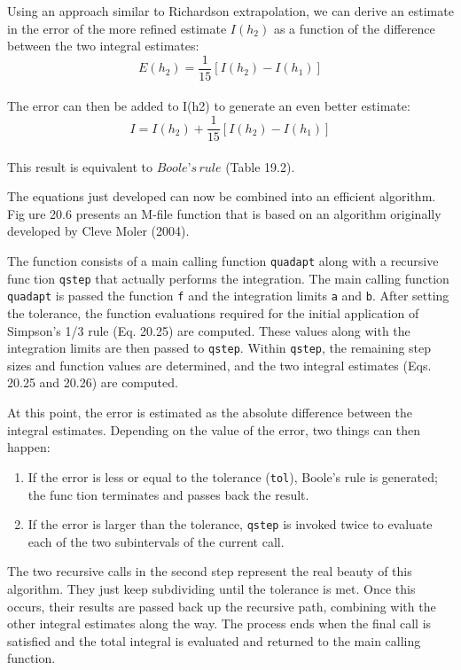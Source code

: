 Using an approach similar to Richardson extrapolation, we can derive an estimate in
the error of the more refined estimate $I(h_2)$ as a function of the difference between the two
integral estimates:
\begin{equation}
	\tag{20.29}
	E(h_2)=\dfrac{1}{15}[I(h_2)-I(h_1)]
\end{equation}\\
The error can then be added to I(h2) to generate an even better estimate:
\begin{equation}
	\tag{20.30}
	I=I(h_2)+\dfrac{1}{15}[I(h_2)-I(h_1)]
\end{equation}\\
This result is equivalent to $Boole’s \, rule$ (Table 19.2). 

The equations just developed can now be combined into an efficient algorithm. Figure 20.6 presents an M-file function that is based on an algorithm originally developed
by Cleve Moler (2004). 

The function consists of a main calling function \texttt{quadapt} along with a recursive function \texttt{qstep} that actually performs the integration. The main calling function \texttt{quadapt} is passed the function \texttt{f} and the integration limits \texttt{a} and \texttt{b}. After setting the tolerance, the
function evaluations required for the initial application of Simpson’s 1/3 rule (Eq. 20.25)
are computed. These values along with the integration limits are then passed to \texttt{qstep}. Within \texttt{qstep}, the remaining step sizes and function values are determined, and the two
integral estimates (Eqs. 20.25 and 20.26) are computed.

At this point, the error is estimated as the absolute difference between the integral
estimates. Depending on the value of the error, two things can then happen:

\begin{enumerate}
	\item If the error is less or equal to the tolerance (\texttt{tol}), Boole’s rule is generated; the function terminates and passes back the result.
	\item If the error is larger than the tolerance, \texttt{qstep} is invoked twice to evaluate each of the
two subintervals of the current call.
\end{enumerate}

The two recursive calls in the second step represent the real beauty of this algorithm.
They just keep subdividing until the tolerance is met. Once this occurs, their results are
passed back up the recursive path, combining with the other integral estimates along the
way. The process ends when the final call is satisfied and the total integral is evaluated and
returned to the main calling function. 

